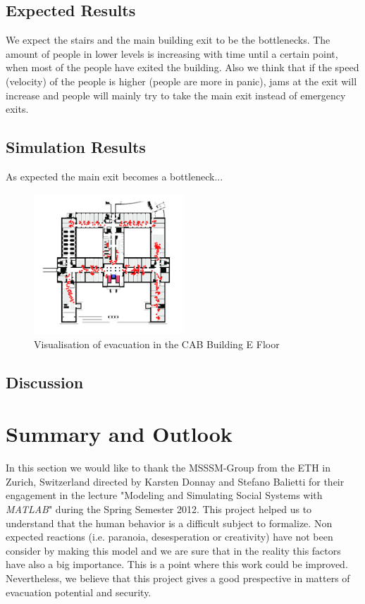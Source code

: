 \documentclass[11pt]{article}
\begin{document}
\subsection{Expected Results}

We expect the stairs and the main building exit to be the bottlenecks. The amount of people in lower levels is increasing with time until a certain point, when most of the people have exited the building. Also we think that if the speed (velocity) of the people is higher (people are more in panic), jams at the exit will increase and people will mainly try to take the main exit instead of emergency exits.

\subsection{Simulation Results}

As expected the main exit becomes a bottleneck...

\begin{figure}[h]
\centering
\includegraphics[width=0.5\textwidth]{./images/cab1.png}
\caption{Visualisation of evacuation in the CAB Building E Floor} 
\label{cab1}
\end{figure}




\subsection{Discussion}


\section{Summary and Outlook}

In this section we would like to thank the MSSSM-Group from the ETH in Zurich, Switzerland directed by Karsten Donnay and Stefano Balietti for their engagement in the lecture "Modeling and Simulating Social Systems with \textit{MATLAB}" during the Spring Semester 2012. This project helped us to understand that the human behavior is a difficult subject to formalize. Non expected reactions (i.e. paranoia, desesperation or creativity) have not been consider by making this model and we are sure that in the reality this factors have also a big importance. This is a point where this work could be improved. Nevertheless, we believe that this project gives a good prespective in matters of evacuation potential and security.
\end{document}
